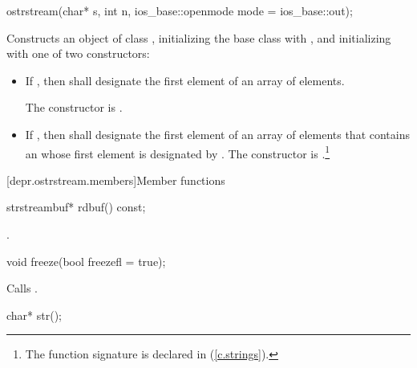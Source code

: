 %
\begin{itemdecl}
ostrstream(char* s, int n, ios_base::openmode mode = ios_base::out);
\end{itemdecl}

\begin{itemdescr}
\pnum
\effects
Constructs an object of class
,
initializing the base class with
,
and initializing  with one of two constructors:

\begin{itemize}
\item
If
,
then  shall designate the first element of an array of  elements.

The constructor is
.
\item
If
,
then  shall designate the first element of an array of  elements that
contains an \ntbs whose first element is designated by .
%
The constructor is
.\footnote{The function signature
is declared in
%
%
(\ref{c.strings}).}
\end{itemize}
\end{itemdescr}

[depr.ostrstream.members]{Member functions}

%
\begin{itemdecl}
strstreambuf* rdbuf() const;
\end{itemdecl}

\begin{itemdescr}
\pnum
\returns
{}.
\end{itemdescr}

%
\begin{itemdecl}
void freeze(bool freezefl = true);
\end{itemdecl}

\begin{itemdescr}
\pnum
\effects
Calls
.
\end{itemdescr}

%
\begin{itemdecl}
char* str();
\end{itemdecl}


